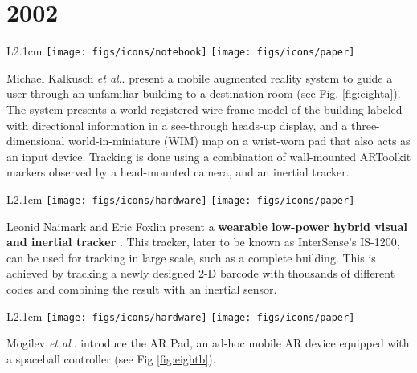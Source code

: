 \documentclass[12pt,a4paper]{article}
\makeatletter
\DeclareRobustCommand\onedot{\futurelet\@let@token\@onedot}
\def\@onedot{\ifx\@let@token.\else.\null\fi\xspace}
\def\etal{\emph{et al}\onedot}
\makeatother
\begin{document}
\vspace{-5pt}
\section*{2002}

\begin{wrapfigure}{L}{2.1cm}
	\vspace{-10pt}	
	\texttt{[image: figs/icons/notebook]}
	\texttt{[image: figs/icons/paper]}	
	\vspace{-20pt}		
\end{wrapfigure}
Michael Kalkusch \etal present a mobile augmented reality system to guide a user through an unfamiliar building to a destination room \cite{Kalkusch02} (see Fig. \ref{fig:eighta}). The system presents a world-registered wire frame model of the building labeled with directional information in a see-through heads-up display, and a three-dimensional world-in-miniature (WIM) map on a wrist-worn pad that also acts as an input device. Tracking is done using a combination of wall-mounted ARToolkit markers observed by a head-mounted camera, and an inertial tracker.

\vspace{0.1in}

\begin{wrapfigure}{L}{2.1cm}
	\vspace{-10pt}	
	\texttt{[image: figs/icons/hardware]}
	\texttt{[image: figs/icons/paper]}	
	\vspace{-20pt}		
\end{wrapfigure}
\noindent Leonid Naimark and Eric Foxlin present a \textbf{wearable low-power hybrid visual and inertial tracker} \cite{Naimark02}. This tracker, later to be known as InterSense’s IS-1200, can be used for tracking in large scale, such as a complete building. This is achieved by tracking a newly designed 2-D barcode with thousands of different codes and combining the result with an inertial sensor.

\vspace{0.1in}

\begin{wrapfigure}{L}{2.1cm}
	\vspace{-15pt}	
	\texttt{[image: figs/icons/hardware]}
	\texttt{[image: figs/icons/paper]}	
	\vspace{-30pt}		
\end{wrapfigure}
\noindent Mogilev \etal introduce the AR Pad, an ad-hoc mobile AR device equipped with a spaceball controller \cite{Mogilev02} (see Fig \ref{fig:eightb}).
\end{document}
